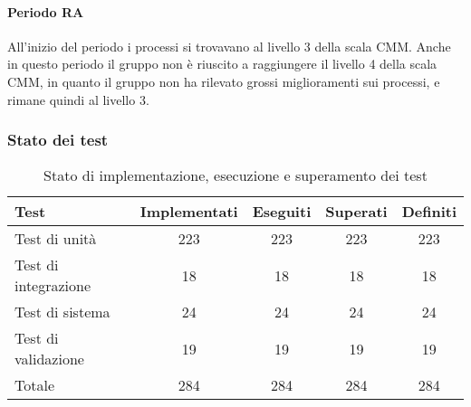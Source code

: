 \documentclass[PdQ.tex]{subfiles}
\begin{document}
\paragraph{Periodo RA}
	All'inizio del periodo i processi si trovavano al livello 3 della scala CMM. Anche in questo periodo il gruppo non è riuscito a raggiungere il livello 4 della scala CMM, in quanto il gruppo non ha rilevato grossi miglioramenti sui processi, e rimane quindi al livello 3.
\subsubsection{Stato dei test}
	\begin{table}[H]
				\centering
				\begin{tabular}{l c c c c}
					\hline
					\rule[-0.3cm]{0cm}{0.8cm}
					\textbf{Test} & \textbf{Implementati} & \textbf{Eseguiti} & \textbf{Superati} & \textbf{Definiti}\\
					\hline
					\rule[0cm]{0cm}{0.4cm}
					Test di unità & 223 & 223 & 223 & 223  \\
					\rule[0cm]{0cm}{0.4cm}
					Test di integrazione & 18 & 18 & 18 & 18 \\
					\rule[0cm]{0cm}{0.4cm}
					Test di sistema & 24 & 24 & 24 & 24  \\
					\rule[0cm]{0cm}{0.4cm}
					Test di validazione & 19 & 19 & 19 & 19  \\
					\rule[0cm]{0cm}{0.4cm}
					Totale & 284 & 284 & 284 & 284  \\
					\hline
				\end{tabular}
				\caption{Stato di implementazione, esecuzione e superamento dei test}
			\end{table}
\end{document}
